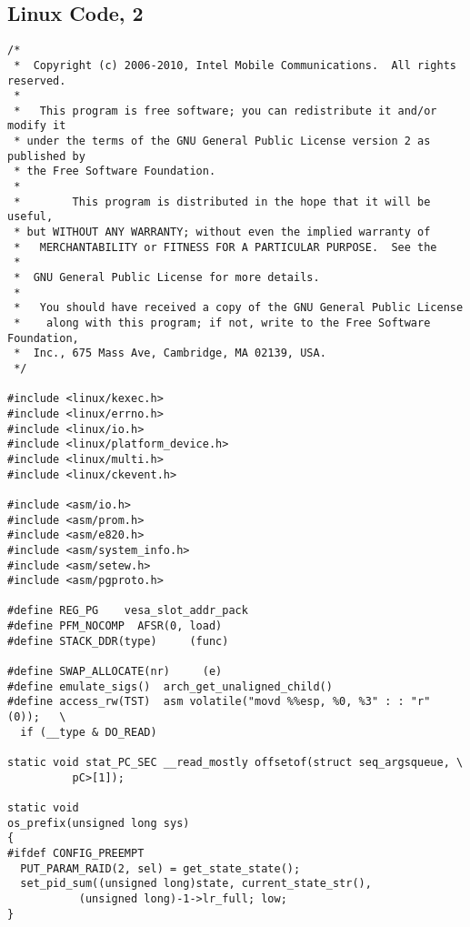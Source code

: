 \subsection{Linux Code, 2}
\begin{verbatim}
/*
 *  Copyright (c) 2006-2010, Intel Mobile Communications.  All rights reserved.
 *
 *   This program is free software; you can redistribute it and/or modify it
 * under the terms of the GNU General Public License version 2 as published by
 * the Free Software Foundation.
 *
 *        This program is distributed in the hope that it will be useful,
 * but WITHOUT ANY WARRANTY; without even the implied warranty of
 *   MERCHANTABILITY or FITNESS FOR A PARTICULAR PURPOSE.  See the
 *
 *  GNU General Public License for more details.
 *
 *   You should have received a copy of the GNU General Public License
 *    along with this program; if not, write to the Free Software Foundation,
 *  Inc., 675 Mass Ave, Cambridge, MA 02139, USA.
 */

#include <linux/kexec.h>
#include <linux/errno.h>
#include <linux/io.h>
#include <linux/platform_device.h>
#include <linux/multi.h>
#include <linux/ckevent.h>

#include <asm/io.h>
#include <asm/prom.h>
#include <asm/e820.h>
#include <asm/system_info.h>
#include <asm/setew.h>
#include <asm/pgproto.h>

#define REG_PG    vesa_slot_addr_pack
#define PFM_NOCOMP  AFSR(0, load)
#define STACK_DDR(type)     (func)

#define SWAP_ALLOCATE(nr)     (e)
#define emulate_sigs()  arch_get_unaligned_child()
#define access_rw(TST)  asm volatile("movd %%esp, %0, %3" : : "r" (0));   \
  if (__type & DO_READ)

static void stat_PC_SEC __read_mostly offsetof(struct seq_argsqueue, \
          pC>[1]);

static void
os_prefix(unsigned long sys)
{
#ifdef CONFIG_PREEMPT
  PUT_PARAM_RAID(2, sel) = get_state_state();
  set_pid_sum((unsigned long)state, current_state_str(),
           (unsigned long)-1->lr_full; low;
}
\end{verbatim}
